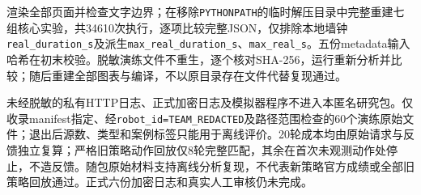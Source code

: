 渲染全部页面并检查文字边界；在移除\texttt{PYTHONPATH}的临时解压目录中完整重建七组核心实验，共34610次执行，逐项比较完整JSON，仅排除本地墙钟\texttt{real\_duration\_s}及派生\texttt{max\_real\_duration\_s}、\texttt{max\_real\_s}。五份metadata输入哈希在初末校验。脱敏演练文件不重生，逐个核对SHA-256，运行重新分析并比较；随后重建全部图表与编译，不以原目录存在文件代替复现通过。

未经脱敏的私有HTTP日志、正式加密日志及模拟器程序不进入本匿名研究包。仅收录manifest指定、经\texttt{robot\_id=TEAM\_REDACTED}及路径范围检查的60个演练原始文件；退出后源数、类型和案例标签只能用于离线评价。20轮成本均由原始请求与反馈独立复算；严格旧策略动作回放仅8轮完整匹配，其余在首次未观测动作处停止，不造反馈。随包原始材料支持离线分析复现，不代表新策略官方成绩或全部旧策略回放通过。正式六份加密日志和真实人工审核仍未完成。
